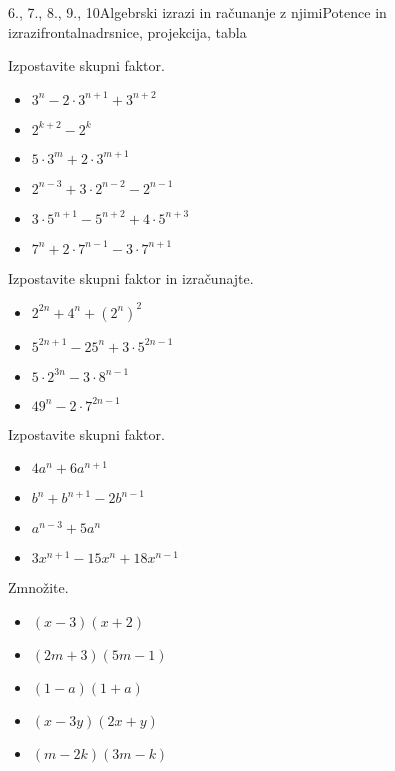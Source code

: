 \begin{priprava}{6., 7., 8., 9., 10}{}{Algebrski izrazi in računanje z njimi}{Potence in izrazi}{frontalna}{drsnice, projekcija, tabla}
\begin{multicols}{2}
\begin{naloga}
    Izpostavite skupni faktor.
    \begin{itemize}
        \item $3^n-2\cdot 3^{n+1}+3^{n+2}$ 
        \item $2^{k+2}-2^k$ 
        \item $5\cdot 3^m+2\cdot 3^{m+1}$ 
        \item $2^{n-3}+3\cdot 2^{n-2}-2^{n-1}$ 
        \item $3\cdot 5^{n+1}-5^{n+2}+4\cdot 5^{n+3}$ 
        \item $7^n+2\cdot 7^{n-1}-3\cdot 7^{n+1}$ 
    \end{itemize}
\end{naloga}



\begin{naloga}
    Izpostavite skupni faktor in izračunajte.
    \begin{itemize}
        \item $2^{2n}+4^n+(2^n)^2$ 
        \item $5^{2n+1}-25^n+3\cdot 5^{2n-1}$ 
        \item $5\cdot 2^{3n}-3\cdot 8^{n-1}$ 
        \item $49^n-2\cdot 7^{2n-1}$ 
    \end{itemize}
\end{naloga}




\begin{naloga}
    Izpostavite skupni faktor.
    \begin{itemize}
        \item $4a^n+6a^{n+1}$ 
        \item $b^n+b^{n+1}-2b^{n-1}$ 
        \item $a^{n-3}+5a^n$ 
        \item $3x^{n+1}-15x^n+18x^{n-1}$ 
    \end{itemize}
\end{naloga}



\begin{naloga}
    Zmnožite.
    \begin{itemize}
        \item $(x-3)(x+2)$ 
        \item $(2m+3)(5m-1)$ 
        \item $(1-a)(1+a)$ 
        \item $(x-3y)(2x+y)$ 
        \item $(m-2k)(3m-k)$ 
    \end{itemize}
\end{naloga}




\end{multicols}
\end{priprava}
